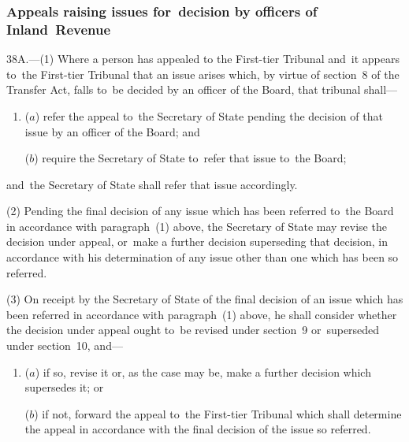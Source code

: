 \documentclass[12pt,a4paper]{article}
\begin{document}
\subsubsection[38A. Appeals raising issues for~decision by officers of Inland~Revenue]{Appeals raising issues for~decision by officers of Inland~Revenue}

38A.---(1)  Where
a person has appealed to 
the First-tier Tribunal and~it appears to~the First-tier Tribunal  %
that an issue arises which, by virtue of section~8 of the Transfer Act, falls to~be decided by an officer of the Board, that tribunal 
shall—
\begin{enumerate}\item[]
($a$) refer the appeal to~the Secretary of State pending the decision of that issue by an officer of the Board; and

($b$) require the Secretary of State to~refer that issue to~the Board;
\end{enumerate}
and~the Secretary of State shall refer that issue accordingly.

(2) Pending the final decision of any issue which has been referred to~the Board in accordance with paragraph~(1) above, the Secretary of State may revise the decision under appeal, or~make a further decision superseding that decision, in accordance with his determination of any issue other than one which has been so referred.

(3) On receipt by the Secretary of State of the final decision of an issue which has been referred in accordance with paragraph~(1) above, he shall consider whether the decision under appeal ought to~be revised under section~9 or~superseded under section~10, and—
\begin{enumerate}\item[]
($a$) if so, revise it or, as the case may be, make a further decision which supersedes it; or

($b$) if not, forward the appeal to~the 
First-tier Tribunal  %
which shall determine the appeal in accordance with the final decision of the issue so referred.
\end{enumerate}
\end{document}
